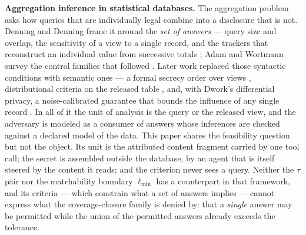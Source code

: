 \documentclass[preprint,12pt]{elsarticle}
\begin{document}
\textbf{Aggregation inference in statistical databases.} The aggregation problem asks how queries
that are individually legal combine into a disclosure that is not. Denning and Denning frame it
around the \emph{set of answers} --- query size and overlap, the sensitivity of a view to a single
record, and the trackers that reconstruct an individual value from successive totals
\cite{denning1979data,chin1981statistical}; Adam and Wortmann survey the control families that
followed \cite{adam1989security}. Later work replaced those syntactic conditions with semantic
ones --- a formal secrecy order over views \cite{miklau2007formal}, distributional criteria on the
released table \cite{machanavajjhala2007diversity}, and, with Dwork's differential privacy, a
noise-calibrated guarantee that bounds the influence of any single record
\cite{dwork2006differential}. In all of it the unit of analysis is the query or the released view,
and the adversary is modeled as a consumer of answers whose inferences are checked against a
declared model of the data. This paper shares the feasibility question but not the object. Its
unit is the attributed content fragment carried by one tool call; the secret is assembled outside
the database, by an agent that is itself steered by the content it reads; and the criterion never
sees a query. Neither the $\tau$ pair nor the matchability boundary $\ell_{\min}$ has a
counterpart in that framework, and its criteria --- which constrain what a set of answers implies
--- cannot express what the coverage-closure family is denied by: that a \emph{single} answer may
be permitted while the union of the permitted answers already exceeds the tolerance.
\end{document}
